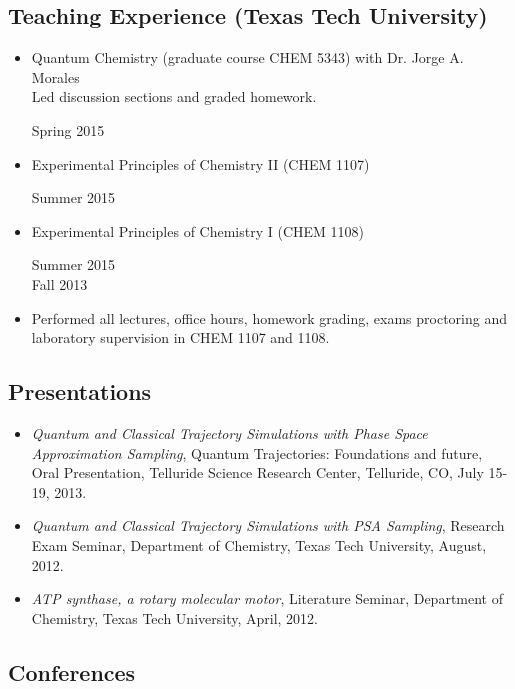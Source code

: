 \documentclass[
]{article}
\providecommand{\tightlist}{%
  \setlength{\itemsep}{0pt}\setlength{\parskip}{0pt}}
\begin{document}
\hypertarget{teaching-experience-texas-tech-university}{%
\subsection{Teaching Experience (Texas Tech
University)}\label{teaching-experience-texas-tech-university}}

\begin{itemize}
\item
  Quantum Chemistry (graduate course CHEM 5343) with Dr. Jorge A.
  Morales\\
  Led discussion sections and graded homework.

  Spring 2015
\item
  Experimental Principles of Chemistry II (CHEM 1107)

  Summer 2015
\item
  Experimental Principles of Chemistry I (CHEM 1108)

  Summer 2015\\
  Fall 2013
\item
  Performed all lectures, office hours, homework grading, exams
  proctoring and laboratory supervision in CHEM 1107 and 1108.
\end{itemize}

\hypertarget{presentations}{%
\subsection{Presentations}\label{presentations}}

\begin{itemize}
\tightlist
\item
  \emph{Quantum and Classical Trajectory Simulations with Phase Space
  Approximation Sampling}, Quantum Trajectories: Foundations and future,
  Oral Presentation, Telluride Science Research Center, Telluride, CO,
  July 15-19, 2013.
\item
  \emph{Quantum and Classical Trajectory Simulations with PSA Sampling},
  Research Exam Seminar, Department of Chemistry, Texas Tech University,
  August, 2012.
\item
  \emph{ATP synthase, a rotary molecular motor}, Literature Seminar,
  Department of Chemistry, Texas Tech University, April, 2012.
\end{itemize}

\hypertarget{conferences}{%
\subsection{Conferences}\label{conferences}}
\end{document}

